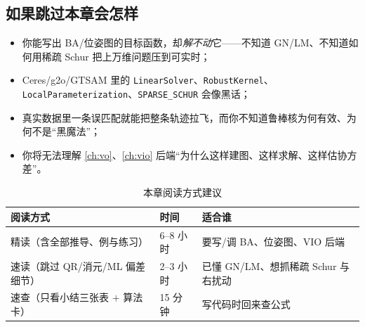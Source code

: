 \subsection*{如果跳过本章会怎样}
\begin{itemize}
  \item 你能写出 BA/位姿图的目标函数，却\emph{解不动}它——不知道 GN/LM、不知道如何用稀疏 Schur 把上万维问题压到可实时；
  \item Ceres/g2o/GTSAM 里的 \texttt{LinearSolver}、\texttt{RobustKernel}、\texttt{LocalParameterization}、\texttt{SPARSE\_SCHUR} 会像黑话；
  \item 真实数据里一条误匹配就能把整条轨迹拉飞，而你不知道鲁棒核为何有效、为何不是“黑魔法”；
  \item 你将无法理解 \cref{ch:vo}、\cref{ch:vio} 后端“为什么这样建图、这样求解、这样估协方差”。
\end{itemize}

\begin{table}[H]\centering\small
\caption{本章阅读方式建议}
\begin{tabular}{lll}
\toprule
阅读方式 & 时间 & 适合谁 \\
\midrule
精读（含全部推导、例与练习） & 6--8 小时 & 要写/调 BA、位姿图、VIO 后端 \\
速读（跳过 QR/消元/ML 偏差细节） & 2--3 小时 & 已懂 GN/LM、想抓稀疏 Schur 与右扰动 \\
速查（只看小结三张表 $+$ 算法卡） & 15 分钟 & 写代码时回来查公式 \\
\bottomrule
\end{tabular}
\end{table}

